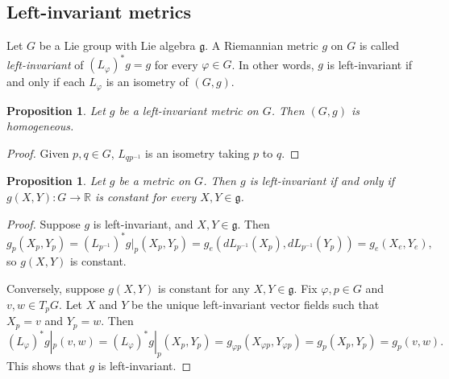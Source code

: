 \documentclass{amsart}
\newcommand{\R}{\mathbb R}
\newcommand{\g}{\mathfrak g}
\theoremstyle{plain}
\newtheorem{proposition}[theorem]{Proposition}
\theoremstyle{definition}
\theoremstyle{remark}
\begin{document}
	\subsection{Left-invariant metrics}
	Let $G$ be a Lie group with Lie algebra $\g$. A Riemannian metric $g$ on $G$ is called \emph{left-invariant} of $(L_\varphi)^*g = g$ for every $\varphi \in G$. In other words, $g$ is left-invariant if and only if each $L_\varphi$ is an isometry of $(G,g)$. 
	
	\begin{proposition}
		Let $g$ be a left-invariant metric on  $G$. Then $(G,g)$ is homogeneous.
	\end{proposition}
	\begin{proof}
		Given $p,q \in G$, $L_{qp^{-1}}$ is an isometry taking $p$ to $q$.
	\end{proof}
	
	\begin{proposition}
		Let $g$ be a metric on $G$. Then $g$ is left-invariant if and only if $g(X,Y):G \rightarrow \R$ is constant for every $X,Y\in \g$.
	\end{proposition}
	\begin{proof}
		Suppose $g$ is left-invariant, and $X,Y \in \g$. Then 
		$$g_p(X_p, Y_p) = (L_{p^{-1}})^* g|_p (X_p,Y_p) = g_e(dL_{p^{-1}}(X_p),dL_{p^{-1}}(Y_p)) = g_e(X_e,Y_e),$$
		so $g(X,Y)$ is constant. 
		
		Conversely, suppose $g(X,Y)$ is constant for any $X,Y \in \g$. Fix $\varphi,p \in G$ and $v,w \in T_p G$. Let $X$ and $Y$ be the unique left-invariant vector fields such that $X_p = v$ and $Y_p = w$. Then 
		$$(L_\varphi)^* g|_p(v,w) =(L_\varphi)^* g|_p(X_p,Y_p) = g_{\varphi p}(X_{\varphi p}, Y_{\varphi p}) = g_p(X_p,Y_p) = g_p(v,w). $$
		This shows that $g$ is left-invariant.
	\end{proof}
	
\end{document}
